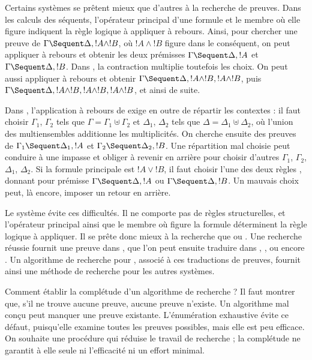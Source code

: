 \documentclass[../../../include/open-logic-section]{subfiles}
\begin{document}
Certains systèmes se prêtent mieux que d'autres à la recherche
de preuves. Dans les calculs des séquents, l'opérateur principal
d'une formule et le membre où elle figure indiquent la règle
logique à appliquer à rebours. Ainsi, pour chercher une preuve
de $\Gamma \Sequent \Delta, !A \land !B$, où $!A \land !B$
figure dans le conséquent, on peut appliquer
\RightR{\land} à rebours et obtenir les deux prémisses
$\Gamma \Sequent \Delta, !A$ et $\Gamma \Sequent \Delta, !B$.
Dans , la contraction multiplie toutefois les choix.
On peut aussi appliquer \RightR{\Contraction} à rebours
et obtenir $\Gamma \Sequent \Delta, !A \land !B, !A \land !B$,
puis $\Gamma \Sequent \Delta, !A \land !B, !A \land !B, !A \land !B$,
et ainsi de suite.

Dans , l'application à rebours de \RightR{\land}
exige en outre de répartir les contextes : il faut choisir
$\Gamma_1$, $\Gamma_2$ tels que $\Gamma = \Gamma_1 \uplus \Gamma_2$
et $\Delta_1$, $\Delta_2$ tels que $\Delta = \Delta_1 \uplus \Delta_2$,
où l'union des multiensembles additionne les multiplicités.
On cherche ensuite des preuves de
$\Gamma_1 \Sequent \Delta_1, !A$ et
$\Gamma_2 \Sequent \Delta_2, !B$.
Une répartition mal choisie peut conduire à une impasse et
obliger à revenir en arrière pour choisir d'autres
$\Gamma_1$, $\Gamma_2$, $\Delta_1$, $\Delta_2$.
Si la formule principale est $!A \lor !B$, il faut choisir
l'une des deux règles \RightR{\lor}, donnant pour prémisse
$\Gamma \Sequent \Delta, !A$ ou $\Gamma \Sequent \Delta, !B$.
Un mauvais choix peut, là encore, imposer un retour en arrière.

Le système  évite ces difficultés. Il ne comporte
pas de règles structurelles, et l'opérateur principal ainsi
que le membre où figure la formule déterminent la règle
logique à appliquer. Il se prête donc mieux à la recherche
que  ou . Une recherche réussie fournit
une preuve dans , que l'on peut ensuite traduire
dans , , ou encore .
Un algorithme de recherche pour , associé à ces
traductions de preuves, fournit ainsi une méthode de recherche
pour les autres systèmes.

Comment établir la complétude d'un algorithme de recherche ?
Il faut montrer que, s'il ne trouve aucune preuve, aucune
preuve n'existe. Un algorithme mal conçu peut manquer une
preuve existante. L'énumération exhaustive évite ce défaut,
puisqu'elle examine toutes les preuves possibles, mais
elle est peu efficace. On souhaite une procédure qui réduise
le travail de recherche ; la complétude ne garantit à elle
seule ni l'efficacité ni un effort minimal.
\end{document}
